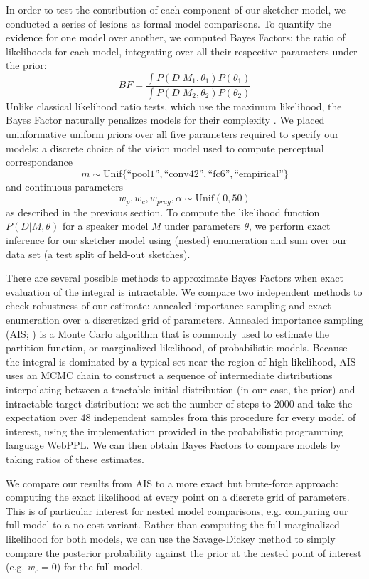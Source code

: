 \documentclass[9pt,twocolumn,twoside]{pnas-new}
\begin{document}
{In order to test the contribution of each component of our sketcher model, we conducted a series of lesions as formal model comparisons.
To quantify the evidence for one model over another, we computed Bayes Factors:
the ratio of likelihoods for each model, integrating over all their respective parameters under the prior:
$$BF = \frac{\int P(D | M_1, \theta_1)P(\theta_1)}{\int P(D | M_2, \theta_2)P(\theta_2)}$$
Unlike classical likelihood ratio tests, which use the maximum likelihood, the Bayes Factor naturally penalizes models for their complexity \cite{rouder}.
We placed uninformative uniform priors over all five parameters required to specify our models: a discrete choice of the vision model used to compute perceptual correspondance
$$m \sim \textrm{Unif}\{\textrm{``pool1''}, \textrm{``conv42''}, \textrm{``fc6''}, \textrm{``empirical''}\}$$
and continuous parameters
$$w_p, w_c, w_{prag}, \alpha \sim \textrm{Unif}(0, 50)$$
as described in the previous section. To compute the likelihood function $P(D | M, \theta)$ for a speaker model $M$ under parameters $\theta$, we perform exact inference for our sketcher model using (nested) enumeration and sum over our data set (a test split of held-out sketches).

There are several possible methods to approximate Bayes Factors when exact evaluation of the integral is intractable. We compare two independent methods to check robustness of our estimate: annealed importance sampling and exact enumeration over a discretized grid of parameters. Annealed importance sampling (AIS; \cite{neal2001}) is a Monte Carlo algorithm that is commonly used to estimate the partition function, or marginalized likelihood, of probabilistic models. Because the integral is dominated by a typical set near the region of high likelihood, AIS uses an MCMC chain to construct a sequence of intermediate distributions interpolating between a tractable initial distribution (in our case, the prior) and intractable target distribution: we set the number of steps to 2000 and take the expectation over 48 independent samples from this procedure for every model of interest, using the implementation provided in the probabilistic programming language WebPPL. We can then obtain Bayes Factors to compare models by taking ratios of these estimates.

We compare our results from AIS to a more exact but brute-force approach: computing the exact likelihood at every point on a discrete grid of parameters.
This is of particular interest for nested model comparisons, e.g. comparing our full model to a no-cost variant.
Rather than computing the full marginalized likelihood for both models, we can use the Savage-Dickey method \cite{WagenmakersEtAl10} to simply compare the posterior probability against the prior at the nested point of interest (e.g. $w_c = 0$) for the full model.

}
\end{document}
